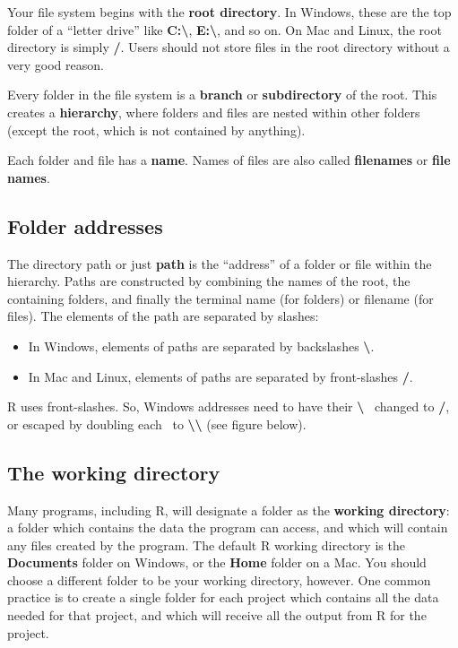 \documentclass[
  13,
  letterpaper,
]{report}
\begin{document}
Your file system begins with the \textbf{root directory}. In Windows,
these are the top folder of a ``letter drive'' like
\textbf{C:\textbackslash{}}, \textbf{E:\textbackslash{}}, and so on. On
Mac and Linux, the root directory is simply \textbf{/}. Users should not
store files in the root directory without a very good reason.

Every folder in the file system is a \textbf{branch} or
\textbf{subdirectory} of the root. This creates a \textbf{hierarchy},
where folders and files are nested within other folders (except the
root, which is not contained by anything).

Each folder and file has a \textbf{name}. Names of files are also called
\textbf{filenames} or \textbf{file names}.

\subsection{Folder addresses}\label{sec-04-files-address}

The directory path or just \textbf{path} is the ``address'' of a folder
or file within the hierarchy. Paths are constructed by combining the
names of the root, the containing folders, and finally the terminal name
(for folders) or filename (for files). The elements of the path are
separated by slashes:

\begin{itemize}
\item
  In Windows, elements of paths are separated by backslashes
  \textbf{\textbackslash{}}.
\item
  In Mac and Linux, elements of paths are separated by front-slashes
  \textbf{/}.
\end{itemize}

R uses front-slashes. So, Windows addresses need to have their
\textbf{\textbackslash{}} ~changed to \textbf{/}, or escaped by doubling
each ~to \textbf{\textbackslash\textbackslash{}} (see figure below).

\subsection{The working directory}\label{sec-04-files-wd}

Many programs, including R, will designate a folder as the
\textbf{working directory}: a folder which contains the data the program
can access, and which will contain any files created by the program. The
default R working directory is the \textbf{Documents} folder on Windows,
or the \textbf{Home} folder on a Mac. You should choose a different
folder to be your working directory, however. One common practice is to
create a single folder for each project which contains all the data
needed for that project, and which will receive all the output from R
for the project.
\end{document}
